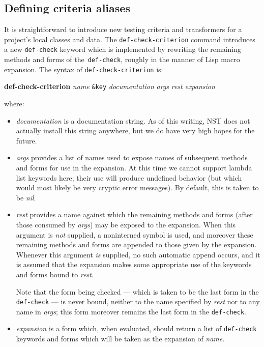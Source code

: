 \documentclass{article}
\begin{document}
\subsection{Defining criteria aliases}
It is straightforward to introduce new testing criteria and
transformers for a project's local classes and data.  The
\texttt{def-check-criterion}
command introduces a new \texttt{def-check} keyword which is
implemented by rewriting the remaining methods and forms of
the~\texttt{def-check}, roughly in the manner of Lisp macro expansion.
The syntax of \texttt{def-check-criterion} is:
\begin{center}
  \textbf{def-check-criterion} \textit{name} \texttt{\&key}
  \textit{documentation} \textit{args} \textit{rest}
  \textit{expansion}
\end{center}
where:
\begin{itemize}
\item\textit{documentation} is a documentation string.  As of this
  writing, NST does not actually install this string anywhere, but we
  do have very high hopes for the future.
\item\textit{args} provides a list of names used to expose names of
  subsequent methods and forms for use in the expansion.  At this time
  we cannot support lambda list keywords here; their use will produce
  undefined behavior (but which would most likely be very cryptic
  error messages).  By default, this is taken to be \textit{nil}.
\item\textit{rest} provides a name against which the remaining methods
  and forms (after those consumed by \textit{args}) may be exposed to
  the expansion.  When this argument is \emph{not} supplied, a
  noninterned symbol is used, and moreover these remaining methods and
  forms are appended to those given by the expansion.  Whenever this
  argument \emph{is} supplied, no such automatic append occurs, and it
  is assumed that the expansion makes some appropriate use of the
  keywords and forms bound to \textit{rest}.

  Note that the form being checked --- which is taken to be the last
  form in the \texttt{def-check} --- is never bound, neither to the
  name specified by \textit{rest} nor to any name in \textit{args};
  this form moreover remains the last form in the \texttt{def-check}.
\item\textit{expansion} is a form which, when evaluated, should return
  a list of \texttt{def-check} keywords and forms which will be taken
  as the expansion of \textit{name}.
\end{itemize}
\end{document}
